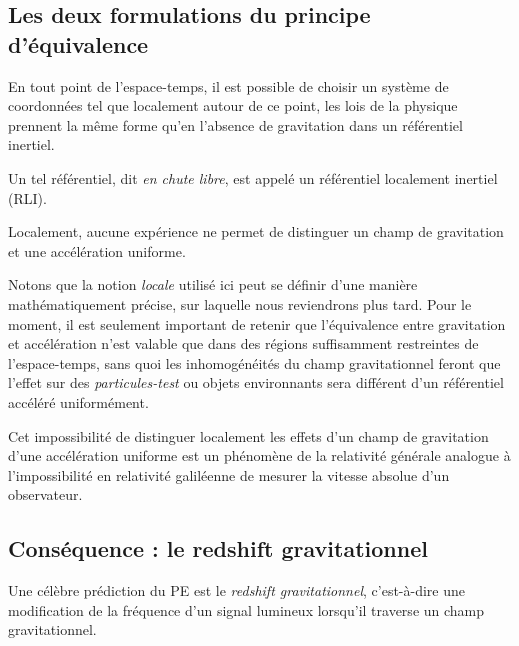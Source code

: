 \subsection{Les deux formulations du principe d'équivalence}
\label{sec:PE2}
\begin{theoremframe}
    \begin{propri}
        En tout point de l'espace-temps, il est possible de choisir un système de coordonnées tel que localement autour de ce point, les lois de la physique prennent la même forme qu'en l'absence de gravitation dans un référentiel inertiel.
    \end{propri}
\end{theoremframe}
Un tel référentiel, dit \emph{en chute libre}, est appelé un référentiel localement inertiel (RLI).
\begin{theoremframe}
    \begin{propri}
        Localement, aucune expérience ne permet de distinguer un champ de gravitation et une accélération uniforme. 
    \end{propri}
\end{theoremframe}
Notons que la notion \emph{locale} utilisé ici peut se définir d'une manière mathématiquement précise, sur laquelle nous reviendrons plus tard. Pour le moment, il est seulement important de retenir que l'équivalence entre gravitation et accélération n'est valable que dans des régions suffisamment restreintes de l'espace-temps, sans quoi les inhomogénéités du champ gravitationnel feront que l'effet sur des \emph{particules-test} ou objets environnants sera différent d'un référentiel accéléré uniformément.

Cet impossibilité de distinguer localement les effets d'un champ de gravitation d'une accélération uniforme est un phénomène de la relativité générale analogue à l'impossibilité en relativité galiléenne de mesurer la vitesse absolue d'un observateur.

\subsection{Conséquence : le redshift gravitationnel}
Une célèbre prédiction du PE est le \emph{redshift gravitationnel}, c’est-à-dire une modification de la fréquence d’un signal lumineux lorsqu’il traverse un champ gravitationnel.
